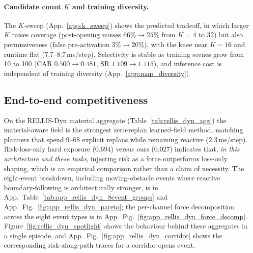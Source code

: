 \paragraph{Candidate count $K$ and training diversity.}
The $K$-sweep (App.~\ref{app:k_sweep}) shows the predicted tradeoff, in which larger $K$ raises coverage (post-opening misses $66\%\!\to\!25\%$ from $K{=}4$ to $32$) but also permissiveness (false pre-activation $3\%\!\to\!20\%$), with the knee near $K{=}16$ and runtime flat ($7.7$--$8.7$\,ms/step). Selectivity is stable as training scenes grow from 10 to 100 (CAR $0.500\!\to\!0.481$, SR $1.109\!\to\!1.115$), and inference cost is independent of training diversity (App.~\ref{app:map_diversity}).

\subsection{End-to-end competitiveness}
\label{sec:exp_e2e}

On the RELLIS-Dyn material aggregate (Table~\ref{tab:rellis_dyn_agg}) the material-aware field is the strongest zero-replan learned-field method, matching planners that spend $9$--$68$ explicit replans while remaining reactive ($2.3$\,ms/step). Risk-loss-only hard exposure ($0.694$) versus ours ($0.027$) indicates that, \emph{in this architecture and these tasks}, injecting risk as a
force outperforms loss-only shaping, which is an empirical comparison rather than a claim of necessity. The eight-event breakdown, including moving-obstacle events where reactive boundary-following is architecturally stronger, is in App.~Table~\ref{tab:app_rellis_dyn_8event_groups} and App.~Fig.~\ref{fig:app_rellis_dyn_pareto}; the per-channel force decomposition across the eight event types is in App.~Fig.~\ref{fig:app_rellis_dyn_force_decomp}. Figure~\ref{fig:rellis_dyn_spotlight} shows the behaviour behind these aggregates in a single episode, and App.~Fig.~\ref{fig:app_rellis_dyn_corridor} shows the corresponding risk-along-path traces for a corridor-opens event.

